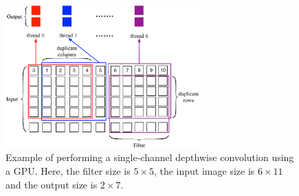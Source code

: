 \begin{figure}[t!]
\centering
  \includegraphics[width=0.9\columnwidth,height=5.5cm]{./figure/twostrategies.eps}
  \caption{Example of performing a single-channel depthwise convolution using a GPU. Here, the filter size is $5 \times 5$, the input image size is $6 \times 11$
  and the output size is $2 \times 7$.}
  \label{fig:twostrategies}
\end{figure}

